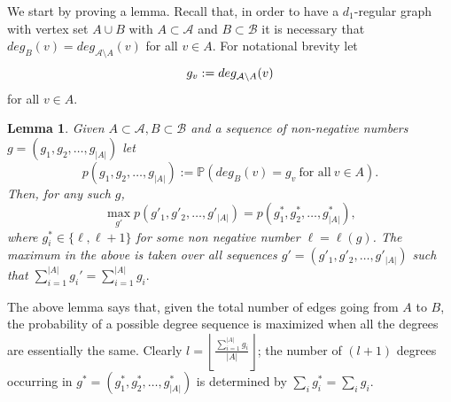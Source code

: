 \documentclass[11pt,reqno]{amsart}
\newtheorem{lemma}{Lemma}
\begin{document}
 We start by proving a lemma. Recall that, in order to have a $d_1$-regular graph with vertex set $A\cup B$ with $A\subset \mathcal{A}$ and  $B\subset \mathcal{B}$ it is necessary that $deg_B(v)=deg_{\mathcal{A}\setminus A}(v)$ for all $v\in A$. For notational brevity let 
\begin{equation}\label{impnotation1} 
 g_v:=deg_{\mathcal{A}\backslash A}(v)
\end{equation} 
  for all $v\in A$. 
\begin{lemma} \label{constant1} Given  $A\subset \mathcal{A},B \subset
  \mathcal{B}$ and a sequence of non-negative numbers $g=(g_1,g_2,
  \ldots, g_{|A|})$ let $$p(g_1,g_2,\ldots,
  g_{|A|}):=\mathbb{P}(deg_B(v)=g_v~ \mbox{for all}~ v\in A).$$ Then,
  for any such $g$, $$\max_{g'} p(g'_1,g'_2,\ldots, g'_{|A|})=
  p(g^*_1,g^*_2,\ldots, g^*_{|A|}),$$ where $g^*_i\in\{\ell,\ell+1\}$
  for some non negative number $\ell=\ell(g)$. The maximum in the
  above is taken over all sequences $g'=(g'_1,g'_2,\ldots, g'_{|A|})$ such that $\sum_{i=1}^{|A|}g_i'=\sum_{i=1}^{|A|} g_i.$
\end{lemma}

The above lemma says that, given the total number of edges going from
$A$ to $B$, the probability of a possible degree sequence is maximized
when all the degrees are essentially the same. Clearly
$l=\left\lfloor{\frac{\sum_{i=1}^{|A|}g_{i}}{|A|}}\right\rfloor$; the
number of $(l+1)$ degrees occurring in $g^*=(g^*_1,g^*_2,\ldots,
g^*_{|A|})$ is determined by $\sum_{i}g^*_i=\sum_{i}g_i.$
\end{document}

